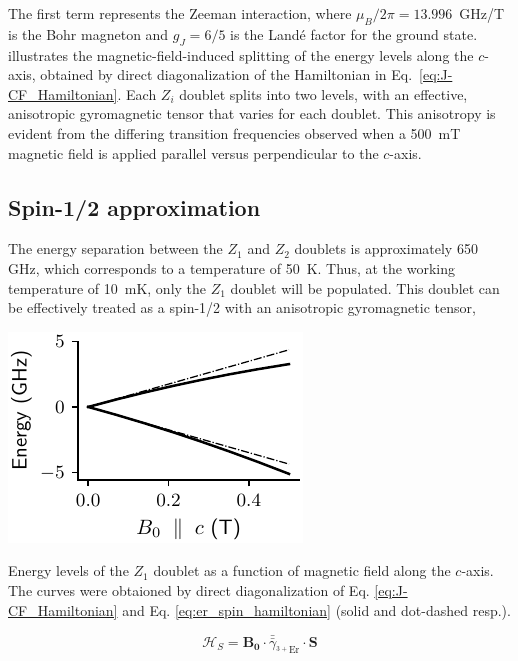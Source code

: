 The first term represents the Zeeman interaction, where $\mu_B/2\pi = 13.996$~GHz/T is the Bohr magneton and $g_J = 6/5$ is the Landé factor for the \Er ground state.  illustrates the magnetic-field-induced splitting of the energy levels along the $c$-axis, obtained by direct diagonalization of the Hamiltonian in Eq.~\ref{eq:J-CF_Hamiltonian}. Each $Z_i$ doublet splits into two levels, with an effective, anisotropic gyromagnetic tensor that varies for each doublet. This anisotropy is evident from the differing transition frequencies observed when a 500~mT magnetic field is applied parallel versus perpendicular to the $c$-axis. 

\subsection{Spin-1/2 approximation}

The energy separation between the $Z_1$ and $Z_2$ doublets is approximately 650 GHz, which corresponds to a temperature of 50~K. Thus, at the working temperature of 10~mK, only the $Z_1$ doublet will be populated. This doublet can be effectively treated as a spin-1/2 with an anisotropic gyromagnetic tensor,

\begin{marginfigure}
    \includegraphics{chapter2/figures/energy_levels_vs_Bz_Z1.pdf}
    \caption{Energy levels of the $Z_1$ doublet as a function of magnetic field along the $c$-axis. The curves were obtaioned by direct diagonalization of Eq. \ref{eq:J-CF_Hamiltonian} and Eq. \ref{eq:er_spin_hamiltonian} (solid and dot-dashed resp.).}
\end{marginfigure}

\begin{equation}
    \label{eq:er_spin_hamiltonian}
    \mathcal{H}_S = \mathbf{B_0}\cdot \bar{\bar{\gamma}}_{^{3+}\text{Er}}\cdot\mathbf{S}
\end{equation}

